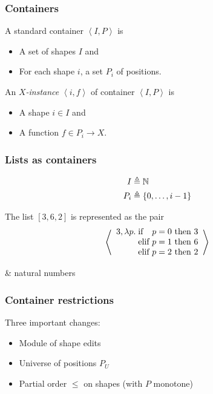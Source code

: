 \documentclass[table]{beamer}
\begin{document}
\begin{frame}
    \frametitle{Containers}
    A standard container $\left<I,P\right>$ is
    \begin{itemize}
        \item A set of shapes $I$ and
        \item For each shape $i$, a set $P_i$ of positions.
    \end{itemize}
    An \emph{$X$-instance} $\left<i,f\right>$ of container $\left<I,P\right>$ is
    \begin{itemize}
        \item A shape $i \in I$ and
        \item A function $f \in P_i \to X$.
    \end{itemize}
\end{frame}

\begin{frame}
    \frametitle{Lists as containers}
    \begin{align*}
        I   &\triangleq \mathbb{N} \\
        P_i &\triangleq \{0,\ldots,i-1\}
    \end{align*}

    \vpause

    The list $[3,6,2]$ is represented as the pair
    \[\left<\begin{array}{l@{\;}l@{\ }r@{}l}3,\lambda p.
        &\mbox{if}  &p=0\mbox{ then }&3\\
        &\mbox{elif}&p=1\mbox{ then }&6\\
        &\mbox{elif}&p=2\mbox{ then }&2
    \end{array}\right>\]

    \begin{pronunciation}
        \nat & natural numbers
    \end{pronunciation}
\end{frame}

\begin{frame}
    \frametitle{Container restrictions}
    Three important changes:

    \begin{itemize}
        \item Module of shape edits
        \item Universe of positions $P_U$
        \item Partial order $\le$ on shapes (with $P$ monotone)
    \end{itemize}
\end{frame}
\end{document}
